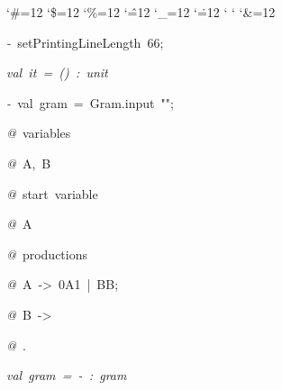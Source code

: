 \begin{list}{}
{\setlength{\leftmargin}{\leftmargini}
\setlength{\rightmargin}{0cm}
\setlength{\itemindent}{0cm}
\setlength{\listparindent}{0cm}
\setlength{\itemsep}{0cm}
\setlength{\parsep}{0cm}
\setlength{\labelsep}{0cm}
\setlength{\labelwidth}{0cm}
\catcode`\#=12
\catcode`\$=12
\catcode`\%=12
\catcode`\^=12
\catcode`\_=12
\catcode`\.=12
\catcode`
\catcode`
\catcode`\&=12
\ttfamily}
\small
\item[]\textsl{-\ }setPrintingLineLength\ 66;
\item[]\textsl{val\ it\ =\ ()\ :\ unit}
\item[]\textsl{-\ }val\ gram\ =\ Gram.input\ "";
\item[]\textsl{@\ }variables
\item[]\textsl{@\ }A,\ B
\item[]\textsl{@\ }start\ variable
\item[]\textsl{@\ }A
\item[]\textsl{@\ }productions
\item[]\textsl{@\ }A\ ->\ 0A1\ |\ BB;
\item[]\textsl{@\ }B\ ->\ %
\item[]\textsl{@\ }.
\item[]\textsl{val\ gram\ =\ -\ :\ gram}
\end{list}

